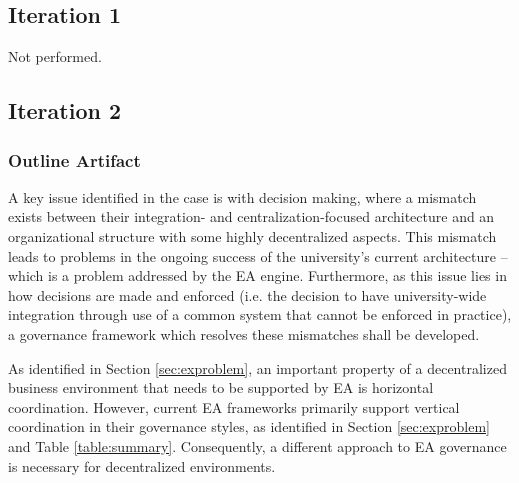 %
%
%
%
%
%
%

\subsection{Iteration 1}

Not performed. 

\subsection{Iteration 2}

\subsubsection*{Outline Artifact}

A key issue identified in the case is with decision making, where a mismatch exists between their integration- and centralization-focused architecture and an organizational structure with some highly decentralized aspects. This mismatch leads to problems in the ongoing success of the university's current architecture -- which is a problem addressed by the EA engine. Furthermore, as this issue lies in how decisions are made and enforced (i.e. the decision to have university-wide integration through use of a common system that cannot be enforced in practice), a governance framework which resolves these mismatches shall be developed. 

As identified in Section \ref{sec:exproblem}, an important property of a decentralized business environment that needs to be supported by EA is horizontal coordination. However, current EA frameworks primarily support vertical coordination in their governance styles, as identified in Section \ref{sec:exproblem} and Table \ref{table:summary}. Consequently, a different approach to EA governance is necessary for decentralized environments.

